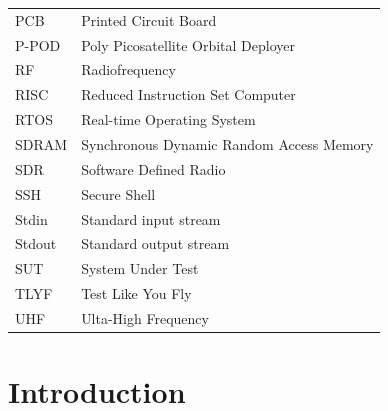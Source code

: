 \documentclass[english,12pt,a4paper,pdftex,elec,utf8]{aaltothesis}
\begin{document}
\begin{tabular}{ll}
PCB 	& Printed Circuit Board \\
P-POD	& Poly Picosatellite Orbital Deployer \\
RF 		& Radiofrequency \\
RISC 	& Reduced Instruction Set Computer \\
RTOS 	& Real-time Operating System \\
SDRAM 	& Synchronous Dynamic Random Access Memory \\
SDR		& Software Defined Radio \\
SSH		& Secure Shell \\
Stdin 	& Standard input stream \\
Stdout 	& Standard output stream \\
SUT 	& System Under Test \\
TLYF 	& Test Like You Fly \\
UHF 	& Ulta-High Frequency


\end{tabular}


\cleardoublepage
\storeinipagenumber
{}
\setcounter{page}{1}


\section{Introduction}

\thispagestyle{empty}
\end{document}
